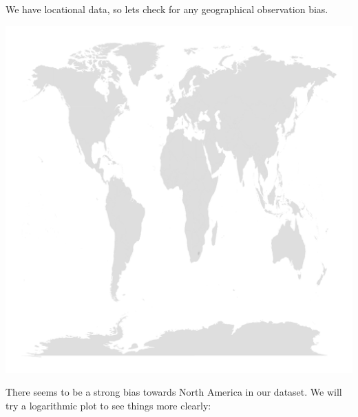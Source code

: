 \documentclass[10pt]{article}\usepackage[]{graphicx}\usepackage[]{color}
\makeatletter
\def\maxwidth{ %
  \ifdim\Gin@nat@width>\linewidth
    \linewidth
  \else
    \Gin@nat@width
  \fi
}
\newenvironment{kframe}{%
 \def\at@end@of@kframe{}%
 \ifinner\ifhmode%
  \def\at@end@of@kframe{\end{minipage}}%
  \begin{minipage}{\columnwidth}%
 \fi\fi%
 \def\FrameCommand##1{\hskip\@totalleftmargin \hskip-\fboxsep
 \colorbox{shadecolor}{##1}\hskip-\fboxsep
     \hskip-\linewidth \hskip-\@totalleftmargin \hskip\columnwidth}%
 \MakeFramed {\advance\hsize-\width
   \@totalleftmargin\z@ \linewidth\hsize
   \@setminipage}}%
 {\par\unskip\endMakeFramed%
 \at@end@of@kframe}
\newenvironment{knitrout}{}{} %
\makeatother
\begin{document}
\begin{itemize}
We have locational data, so lets check for any geographical observation bias.
\begin{knitrout}
\color{fgcolor}\begin{kframe}


{\ttfamily\noindent\color{warningcolor}{\#\# Warning: Computation failed in `stat\_binhex()`:\\\#\# Package `hexbin` required for `stat\_binhex`.\\\#\# Please install and try again.}}\end{kframe}
\includegraphics[width=\maxwidth]{figure/unnamed-chunk-15-1} 

\end{knitrout}
There seems to be a strong bias towards North America in our dataset. We will try a logarithmic plot to see things more clearly:
\begin{knitrout}
\color{fgcolor}\begin{kframe}



\end{kframe}
\end{knitrout}
\end{itemize}
\end{document}
